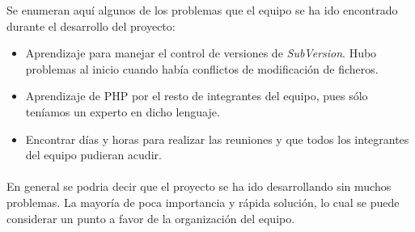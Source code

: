 Se enumeran aquí algunos de los problemas que el equipo se ha ido encontrado durante el desarrollo del proyecto:

\begin{itemize}
	\item Aprendizaje para manejar el control de versiones de \textit{SubVersion}. Hubo problemas al inicio cuando había conflictos de modificación de ficheros.
	\item Aprendizaje de PHP por el resto de integrantes del equipo, pues sólo teníamos un experto en dicho lenguaje.
	\item Encontrar días y horas para realizar las reuniones y que todos los integrantes del equipo pudieran acudir.
\end{itemize}

\paragraph{} En general se podria decir que el proyecto se ha ido desarrollando sin muchos problemas. La mayoría de poca importancia y rápida solución, lo cual se puede considerar un punto a favor de la organización del equipo.
